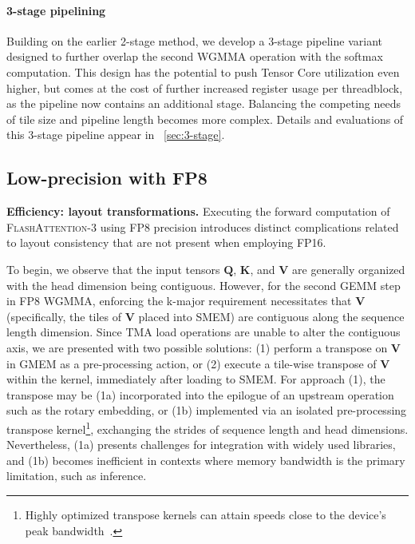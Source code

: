 \begin{enumerate}
\begin{algorithm}[H]
\begin{algorithmic}[1]
\paragraph{3-stage pipelining} Building on the earlier 2-stage method, we develop a 3-stage pipeline variant designed to further overlap the second WGMMA operation with the softmax computation. This design has the potential to push Tensor Core utilization even higher, but comes at the cost of further increased register usage per threadblock, as the pipeline now contains an additional stage. Balancing the competing needs of tile size and pipeline length becomes more complex. Details and evaluations of this 3-stage pipeline appear in ~\cref{sec:3-stage}.

\subsection{Low-precision with FP8}
\label{sec:algofp8}

\textbf{Efficiency: layout transformations.} Executing the forward computation of \textsc{FlashAttention-3} using FP8 precision introduces distinct complications related to layout consistency that are not present when employing FP16.

To begin, we observe that the input tensors $\mathbf{Q}$, $\mathbf{K}$, and $\mathbf{V}$ are generally organized with the head dimension being contiguous. However, for the second GEMM step in FP8 WGMMA, enforcing the k-major requirement necessitates that $\mathbf{V}$ (specifically, the tiles of $\mathbf{V}$ placed into SMEM) are contiguous along the sequence length dimension. Since TMA load operations are unable to alter the contiguous axis, we are presented with two possible solutions: (1) perform a transpose on $\mathbf{V}$ in GMEM as a pre-processing action, or (2) execute a tile-wise transpose of $\mathbf{V}$ within the kernel, immediately after loading to SMEM. For approach (1), the transpose may be (1a) incorporated into the epilogue of an upstream operation such as the rotary embedding, or (1b) implemented via an isolated pre-processing transpose kernel\footnote{Highly optimized transpose kernels can attain speeds close to the device’s peak bandwidth~\citep{colfax_cutlass_transpose_2024}.}, exchanging the strides of sequence length and head dimensions. Nevertheless, (1a) presents challenges for integration with widely used libraries, and (1b) becomes inefficient in contexts where memory bandwidth is the primary limitation, such as inference.


\end{algorithmic}
\end{algorithm}
\end{enumerate}
